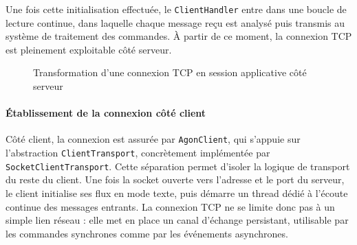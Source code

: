 \documentclass[a4paper]{article}
\begin{document}
Une fois cette initialisation effectuée, le \texttt{ClientHandler} entre dans une boucle de lecture continue, dans laquelle chaque message reçu est analysé puis transmis au système de traitement des commandes. À partir de ce moment, la connexion TCP est pleinement exploitable côté serveur.

\begin{figure}[H]
\centering
{}
\caption{Transformation d'une connexion TCP en session applicative côté serveur}
\label{fig:tcp_session_serveur}
\end{figure}

\paragraph{Établissement de la connexion côté client}

Côté client, la connexion est assurée par \texttt{AgonClient}, qui s’appuie sur l’abstraction \texttt{ClientTransport}, concrètement implémentée par \texttt{SocketClientTransport}. Cette séparation permet d’isoler la logique de transport du reste du client. Une fois la socket ouverte vers l’adresse et le port du serveur, le client initialise ses flux en mode texte, puis démarre un thread dédié à l’écoute continue des messages entrants. La connexion TCP ne se limite donc pas à un simple lien réseau : elle met en place un canal d’échange persistant, utilisable par les commandes synchrones comme par les événements asynchrones.
\end{document}
